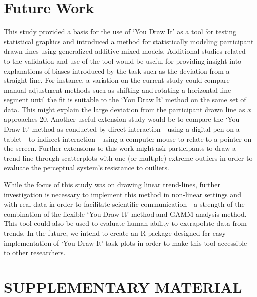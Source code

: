 \documentclass[12pt]{article}
\begin{document}
\hypertarget{future-work}{%
\section{Future Work}\label{future-work}}

This study provided a basis for the use of `You Draw It' as a tool for
testing statistical graphics and introduced a method for statistically
modeling participant drawn lines using generalized additive mixed
models. Additional studies related to the validation and use of the tool
would be useful for providing insight into explanations of biases
introduced by the task such as the deviation from a straight line. For
instance, a variation on the current study could compare manual
adjustment methods such as shifting and rotating a horizontal line
segment until the fit is suitable to the `You Draw It' method on the
same set of data. This might explain the large deviation from the
participant drawn line as \(x\) approaches 20. Another useful extension
study would be to compare the `You Draw It' method as conducted by
direct interaction - using a digital pen on a tablet - to indirect
interaction - using a computer mouse to relate to a pointer on the
screen. Further extensions to this work might ask participants to draw a
trend-line through scatterplots with one (or multiple) extreme outliers
in order to evaluate the perceptual system's resistance to outliers.

While the focus of this study was on drawing linear trend-lines, further
investigation is necessary to implement this method in non-linear
settings and with real data in order to facilitate scientific
communication - a strength of the combination of the flexible `You Draw
It' method and GAMM analysis method. This tool could also be used to
evaluate human ability to extrapolate data from trends. In the future,
we intend to create an R package designed for easy implementation of
`You Draw It' task plots in order to make this tool accessible to other
researchers.

\hypertarget{supplementary-material}{%
\section{SUPPLEMENTARY MATERIAL}\label{supplementary-material}}
\end{document}
